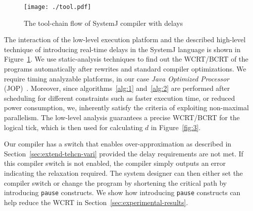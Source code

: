 \begin{figure}[h!]
  \centering
  \texttt{[image: ./tool.pdf]}
  \caption{The tool-chain flow of SystemJ compiler with delays}
  \label{fig:4}
\end{figure}

The interaction of the low-level execution platform and the described
high-level technique of introducing real-time delays in the SystemJ
language is shown in Figure~\ref{fig:4}. We use static-analysis
techniques to find out the WCRT/BCRT of the programs automatically after
rewrites and standard compiler optimizations. We require timing
analyzable platforms, in our case \textit{Java Optimized Processor}
(JOP)~\cite{jop:jnl:jsa2007}. Moreover, since algorithms~\ref{alg:1}
and~\ref{alg:2} are performed after scheduling for different constraints
such as faster execution time, or reduced power consumption, we,
inherently satisfy the criteria of exploiting non-maximal
parallelism. The low-level analysis guarantees a precise WCRT/BCRT for
the logical tick, which is then used for calculating $d$ in
Figure~\ref{fig:3}.

Our compiler has a switch that enables over-approximation as described
in Section~\ref{sec:extend-tehcn-vari} provided the delay requirements
are not met. If this compiler switch is not enabled, the compiler simply
outputs an error indicating the relaxation required. The system designer
can then either set the compiler switch or change the program by
shortening the critical path by introducing \texttt{pause}
constructs. We show how introducing \texttt{pause} constructs can help
reduce the WCRT in Section~\ref{sec:experimental-results}.


